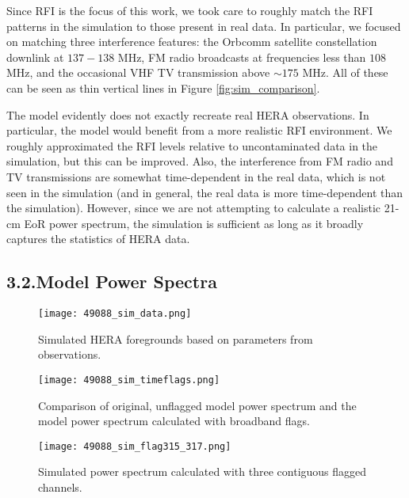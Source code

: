 \documentclass[12pt]{article}
\begin{document}
Since RFI is the focus of this work, we took care to roughly match the RFI patterns in the simulation to those present in real data. In particular, we focused on matching three interference features: the Orbcomm satellite constellation downlink at $137 - 138$ MHz, FM radio broadcasts at frequencies less than $108$ MHz, and the occasional VHF TV transmission above $\sim 175$ MHz. All of these can be seen as thin vertical lines in Figure \ref{fig:sim_comparison}.

The model evidently does not exactly recreate real HERA observations. In particular, the model would benefit from a more realistic RFI environment. We roughly approximated the RFI levels relative to uncontaminated data in the simulation, but this can be improved. Also, the interference from FM radio and TV transmissions are somewhat time-dependent in the real data, which is not seen in the simulation (and in general, the real data is more time-dependent than the simulation). However, since we are not attempting to calculate a realistic 21-cm EoR power spectrum, the simulation is sufficient as long as it broadly captures the statistics of HERA data. \vspace{3mm}

\tocless\subsection{\hypertarget{subsec:simtests}{3.2.\hspace{0.75em}Model Power Spectra}}

\begin{figure}[t]
	\centering
	\texttt{[image: 49088\_sim\_data.png]}
	\caption[Model data]{Simulated HERA foregrounds based on parameters from observations.}
	\label{fig:sim_data}
\end{figure}

\begin{figure}[p]
	\centering
	\texttt{[image: 49088\_sim\_timeflags.png]}
	\caption[Model power spectrum calculated with data flagged only in time]{Comparison of original, unflagged model power spectrum and the model power spectrum calculated with broadband flags.}
	\label{fig:sim_time_flags}
\end{figure}

\begin{figure}[p]
	\centering
	\texttt{[image: 49088\_sim\_flag315\_317.png]}
	\caption[Model power spectrum calculated with flagged time integrations and three contiguous flagged channels]{Simulated power spectrum calculated with three contiguous flagged channels.}
	\label{fig:sim_flag_chan315_317}
\end{figure}
\end{document}
